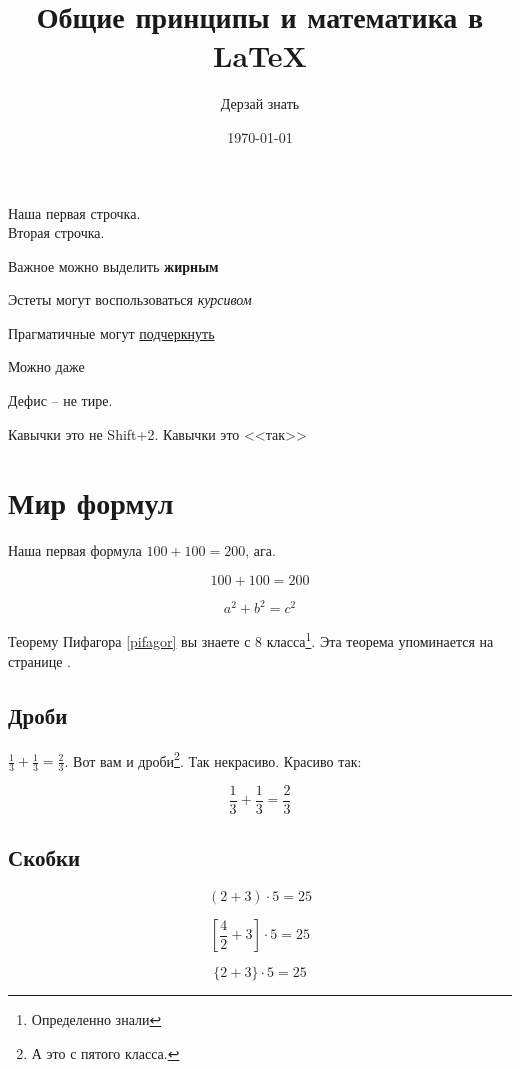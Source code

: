 \documentclass[a4paper,12pt]{article} %
\author{Дерзай знать}
\title{Общие принципы и математика в \LaTeX{}}
\date{\today}
\begin{document}

\maketitle

\tableofcontents

\newpage

Наша первая строчка.\\[2cm]
Вторая \hspace{20pt} строчка.

Важное можно выделить \textbf{жирным}

Эстеты могут воспользоваться \textit{курсивом}

Прагматичные могут \underline{подчеркнуть}

Можно даже 

Дефис -- не тире.

Кавычки это не Shift+2. Кавычки это <<так>>

\section{Мир формул}

Наша первая формула $100+100=200$, ага.

\[ 100+100=200 \]

\begin{equation}\label{pifagor}
a^2+b^2=c^2
\end{equation}

Теорему Пифагора \eqref{pifagor} вы знаете с 8 класса\footnote{Определенно знали}. Эта теорема упоминается на странице \pageref{pifagor}.

\subsection{Дроби}

$\frac{1}{3}+\frac{1}{3}=\frac{2}{3}$. Вот вам и дроби\footnote{А это с пятого класса.}. {\scriptsize Так некрасиво.} {\Large Красиво так}:

\[ \frac{1}{3}+\frac{1}{3}=\frac{2}{3} \]


\subsection{Скобки}

\[ (2+3)\cdot 5=25 \]

\[ \left[\frac{4}{2}+3\right]\cdot 5=25 \]

\[ \{2+3\}\cdot 5=25 \]
\end{document}
